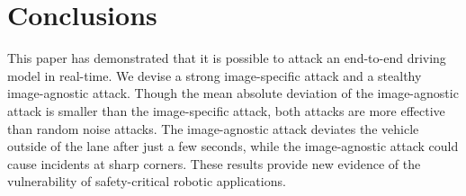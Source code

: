 \addtolength{\textheight}{-2cm}


\section{Conclusions}

This paper has demonstrated that it is possible to attack an end-to-end driving model in real-time. We devise a strong image-specific attack and a stealthy image-agnostic attack. Though the mean absolute deviation of the image-agnostic attack is smaller than the image-specific attack, both attacks are more effective than random noise attacks. The image-agnostic attack deviates the vehicle outside of the lane after just a few seconds, while the image-agnostic attack could cause incidents at sharp corners. These results provide new evidence of the vulnerability of safety-critical robotic applications.


\clearpage

